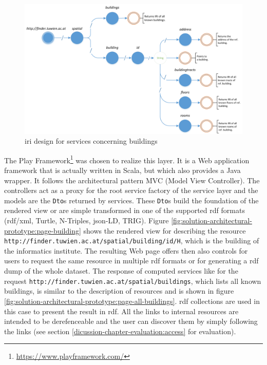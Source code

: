 \documentclass[draft,final]{vutinfth} %
\begin{document}
\begin{figure}[h]
    \centering
    \includegraphics[width=1.0\textwidth]{graphics/buildingApiTree.png}
    \caption{\gls{iri} design for services concerning buildings}
    \label{fig:solution-architectural-prototype:restful-api}
\end{figure}

The Play Framework\footnote{\url{https://www.playframework.com/}} was chosen to realize this layer. It is a Web application framework that is actually written in Scala, but which also provides a Java wrapper. It follows the architectural pattern MVC (Model View Controller). The controllers act as a proxy for the root service factory of the service layer and the models are the \texttt{Dto}s returned by services. These \texttt{Dto}s build the foundation of the rendered view or are simple transformed in one of the supported \gls{rdf} formats (\gls{rdf}/\gls{xml}, Turtle, N-Triples, \gls{json}-LD, TRIG). Figure \ref{fig:solution-architectural-prototype:page-building} shows the rendered view for describing the resource \texttt{http://finder.tuwien.ac.at/spatial/building/id/H}, which is the building of the informatics institute. The resulting Web page offers then also controls for users to request the same resource in multiple \gls{rdf} formats or for generating a \gls{rdf} dump of the whole dataset. The response of computed services like for the request \texttt{http://finder.tuwien.ac.at/spatial/buildings}, which lists all known buildings, is similar to the description of resources and is shown in figure \ref{fig:solution-architectural-prototype:page-all-buildings}. \gls{rdf} collections are used in this case to present the result in \gls{rdf}. All the links to internal resources are intended to be derefenceable and the user can discover them by simply following the links (see section \ref{dicussion-chapter-evaluation:access} for evaluation). 
\end{document}

